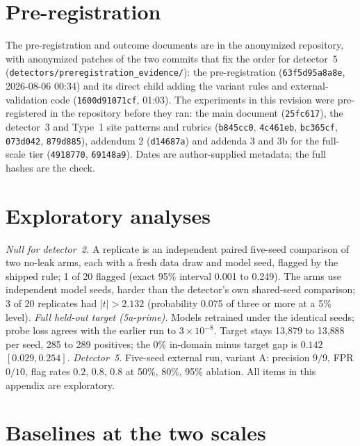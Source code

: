 \documentclass[pmlr,twocolumn,10pt]{jmlr}
\begin{document}
\section{Pre-registration}\label{apd:prereg}

The pre-registration and outcome documents are in the anonymized repository,
with anonymized patches of the two commits that fix the order for detector~5
(\texttt{detectors/preregistration\_evidence/}): the pre-registration
(\texttt{63f5d95a8a8e}, 2026-08-06 00:34) and its direct child adding the
variant rules and external-validation code (\texttt{1600d91071cf}, 01:03).
The experiments in this revision were pre-registered in the repository before
they ran: the main document (\texttt{25fc617}), the detector~3 and Type~1 site
patterns and rubrics (\texttt{b845cc0}, \texttt{4c461eb}, \texttt{bc365cf},
\texttt{073d042}, \texttt{879d885}), addendum 2 (\texttt{d14687a}) and addenda 3
and 3b for the full-scale tier (\texttt{4918770}, \texttt{69148a9}). Dates are
author-supplied metadata; the full hashes are the check.

\section{Exploratory analyses}\label{apd:expl}

\emph{Null for detector~2.} A replicate is an independent paired five-seed
comparison of two no-leak arms, each with a fresh data draw and model seed,
flagged by the shipped rule; 1 of 20 flagged (exact 95\% interval 0.001 to
0.249). The arms use independent model seeds, harder than the detector's own
shared-seed comparison; 3 of 20 replicates had $|t|>2.132$ (probability 0.075 of
three or more at a 5\% level). \emph{Full held-out target (5a-prime).} Models
retrained under the identical seeds; probe loss agrees with the earlier run to
$3\times10^{-8}$. Target stays 13{,}879 to 13{,}888 per seed, 285 to 289
positives; the 0\% in-domain minus target gap is $0.142$ $[0.029, 0.254]$.
\emph{Detector~5.} Five-seed external run, variant A: precision $9/9$, FPR
$0/10$, flag rates $0.2$, $0.8$, $0.8$ at 50\%, 80\%, 95\% ablation. All items in
this appendix are exploratory.

\section{Baselines at the two scales}\label{apd:base}
\end{document}

